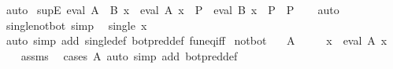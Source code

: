 \begin{isabellebody}
\ auto%
\endisatagproof
{\isafoldproof}%
%
\isadelimproof
\isanewline
%
\endisadelimproof
\isanewline
{}\isamarkupfalse%
\ supE{\isacharcolon}{\kern0pt}\ {\isachardoublequoteopen}eval\ {\isacharparenleft}{\kern0pt}A\ {\isasymsqunion}\ B{\isacharparenright}{\kern0pt}\ x\ {\isasymLongrightarrow}\ {\isacharparenleft}{\kern0pt}eval\ A\ x\ {\isasymLongrightarrow}\ P{\isacharparenright}{\kern0pt}\ {\isasymLongrightarrow}\ {\isacharparenleft}{\kern0pt}eval\ B\ x\ {\isasymLongrightarrow}\ P{\isacharparenright}{\kern0pt}\ {\isasymLongrightarrow}\ P{\isachardoublequoteclose}\isanewline
%
\isadelimproof
\ \ %
\endisadelimproof
%
\isatagproof
{}\isamarkupfalse%
\ auto%
\endisatagproof
{\isafoldproof}%
%
\isadelimproof
\isanewline
%
\endisadelimproof
\isanewline
{}\isamarkupfalse%
\ single{\isacharunderscore}{\kern0pt}not{\isacharunderscore}{\kern0pt}bot\ {\isacharbrackleft}{\kern0pt}simp{\isacharbrackright}{\kern0pt}{\isacharcolon}{\kern0pt}\isanewline
\ \ {\isachardoublequoteopen}single\ x\ {\isasymnoteq}\ {\isasymbottom}{\isachardoublequoteclose}\isanewline
%
\isadelimproof
\ \ %
\endisadelimproof
%
\isatagproof
{}\isamarkupfalse%
\ {\isacharparenleft}{\kern0pt}auto\ simp\ add{\isacharcolon}{\kern0pt}\ single{\isacharunderscore}{\kern0pt}def\ bot{\isacharunderscore}{\kern0pt}pred{\isacharunderscore}{\kern0pt}def\ fun{\isacharunderscore}{\kern0pt}eq{\isacharunderscore}{\kern0pt}iff{\isacharparenright}{\kern0pt}%
\endisatagproof
{\isafoldproof}%
%
\isadelimproof
\isanewline
%
\endisadelimproof
\isanewline
{}\isamarkupfalse%
\ not{\isacharunderscore}{\kern0pt}bot{\isacharcolon}{\kern0pt}\isanewline
\ \ \ {\isachardoublequoteopen}A\ {\isasymnoteq}\ {\isasymbottom}{\isachardoublequoteclose}\isanewline
\ \ \ x\ \ {\isachardoublequoteopen}eval\ A\ x{\isachardoublequoteclose}\isanewline
%
\isadelimproof
\ \ %
\endisadelimproof
%
\isatagproof
{}\isamarkupfalse%
\ assms\ \isamarkupfalse%
\ {\isacharparenleft}{\kern0pt}cases\ A{\isacharparenright}{\kern0pt}\ {\isacharparenleft}{\kern0pt}auto\ simp\ add{\isacharcolon}{\kern0pt}\ bot{\isacharunderscore}{\kern0pt}pred{\isacharunderscore}{\kern0pt}def{\isacharparenright}{\kern0pt}%
\endisatagproof
{\isafoldproof}%
%
\isadelimproof
%
\endisadelimproof
%
\isadelimdocument
%
\endisadelimdocument
%
\isatagdocument
%
\isamarkuptrue%
%
\endisatagdocument
{\isafolddocument}%
%
\isadelimdocument
%
\endisadelimdocument

\end{isabellebody}
